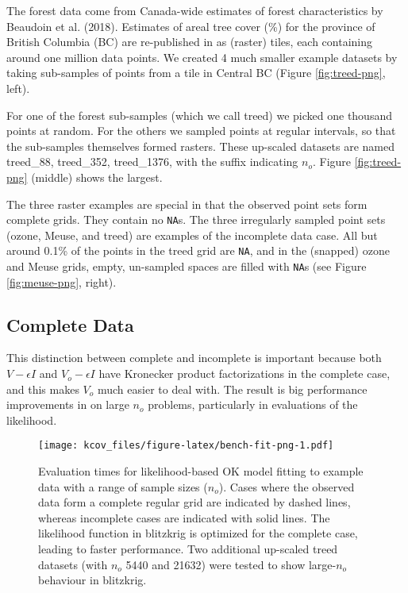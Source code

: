 The forest data come from Canada-wide estimates of forest characteristics by Beaudoin et al. (2018). Estimates of areal tree cover (\%) for the province of British Columbia (BC) are re-published in  as (raster) tiles, each containing around one million data points. We created 4 much smaller example datasets by taking sub-samples of points from a tile in Central BC (Figure \ref{fig:treed-png}, left).

For one of the forest sub-samples (which we call treed) we picked one thousand points at random. For the others we sampled points at regular intervals, so that the sub-samples themselves formed rasters. These up-scaled datasets are named treed\_88, treed\_352, treed\_1376, with the suffix indicating \(n_o\). Figure \ref{fig:treed-png} (middle) shows the largest.

The three raster examples are special in that the observed point sets form complete grids. They contain no \texttt{NA}s. The three irregularly sampled point sets (ozone, Meuse, and treed) are examples of the incomplete data case. All but around 0.1\% of the points in the treed grid are \texttt{NA}, and in the (snapped) ozone and Meuse grids, empty, un-sampled spaces are filled with \texttt{NA}s (see Figure \ref{fig:meuse-png}, right).

\hypertarget{complete-data}{%
\subsection{Complete Data}\label{complete-data}}

This distinction between complete and incomplete is important because both \(V - \epsilon I\) and \(V_o - \epsilon I\) have Kronecker product factorizations in the complete case, and this makes \(V_o\) much easier to deal with. The result is big performance improvements in  on large \(n_o\) problems, particularly in evaluations of the likelihood.

\begin{figure}
\centering
\texttt{[image: kcov\_files/figure-latex/bench-fit-png-1.pdf]}
\caption{\label{fig:bench-fit-png}Evaluation times for likelihood-based OK model fitting to example data with a range of sample sizes (\(n_o\)). Cases where the observed data form a complete regular grid are indicated by dashed lines, whereas incomplete cases are indicated with solid lines. The likelihood function in blitzkrig is optimized for the complete case, leading to faster performance. Two additional up-scaled treed datasets (with \(n_o\) 5440 and 21632) were tested to show large-\(n_o\) behaviour in blitzkrig.}
\end{figure}

